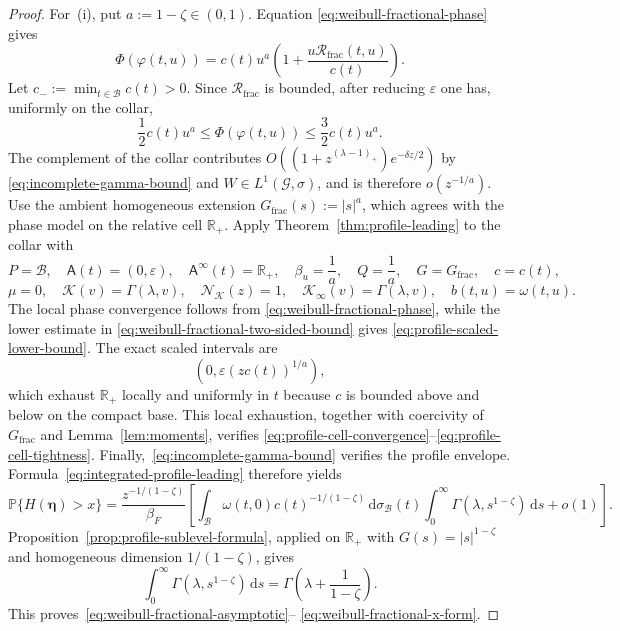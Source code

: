 \documentclass[11pt]{amsart}
\numberwithin{equation}{section}
\theoremstyle{definition}
\theoremstyle{remark}
\newcommand{\R}{\mathbb{R}}
\newcommand{\dd}{\,\mathrm{d}}
\newcommand{\eps}{\varepsilon}
\newcommand{\Afib}{\mathsf{A}}
\begin{document}
\begin{proof}
For~(i), put $a:=1-\zeta\in(0,1)$.  Equation
\eqref{eq:weibull-fractional-phase} gives
\[
 \Phi(\varphi(t,u))
 =c(t)u^a\left(1+\frac{u\mathcal R_{\mathrm{frac}}(t,u)}{c(t)}\right).
\]
Let $c_-:=\min_{t\in\mathcal B}c(t)>0$.  Since
$\mathcal R_{\mathrm{frac}}$ is bounded, after reducing $\eps$ one has,
uniformly on the collar,
\begin{equation}\label{eq:weibull-fractional-two-sided-bound}
 \frac12c(t)u^a
 \le \Phi(\varphi(t,u))
 \le \frac32c(t)u^a.
\end{equation}
The complement of the collar contributes
$O((1+z^{(\lambda-1)_+})e^{-\delta z/2})$ by
\eqref{eq:incomplete-gamma-bound} and $W\in L^1(\mathcal G,\sigma)$, and is
therefore $o(z^{-1/a})$.  Use the ambient homogeneous extension
$G_{\mathrm{frac}}(s):=|s|^a$, which agrees with the phase model on the
relative cell $\R_+$.  Apply Theorem~\ref{thm:profile-leading} to the collar
with
\[
 P=\mathcal B,
 \quad \Afib(t)=(0,\eps),
 \quad \Afib^\infty(t)=\R_+,
 \quad \beta_u=\frac{1}{a},
 \quad Q=\frac{1}{a},
 \quad G=G_{\mathrm{frac}},
 \quad c=c(t),
\]
\[
 \mu=0,
 \quad \mathcal K(v)=\Gamma(\lambda,v),
 \quad \mathcal N_{\mathcal K}(z)=1,
 \quad \mathcal K_\infty(v)=\Gamma(\lambda,v),
 \quad b(t,u)=\omega(t,u).
\]
The local phase convergence follows from
\eqref{eq:weibull-fractional-phase}, while the lower estimate in
\eqref{eq:weibull-fractional-two-sided-bound} gives
\eqref{eq:profile-scaled-lower-bound}.  The exact scaled intervals are
\[
 (0,\eps(zc(t))^{1/a}),
\]
which exhaust $\R_+$ locally and uniformly in $t$ because $c$ is bounded
above and below on the compact base.  This local exhaustion, together with
coercivity of $G_{\mathrm{frac}}$ and Lemma~\ref{lem:moments}, verifies
\eqref{eq:profile-cell-convergence}--\eqref{eq:profile-cell-tightness}.
Finally,~\eqref{eq:incomplete-gamma-bound} verifies the profile envelope.
Formula~\eqref{eq:integrated-profile-leading} therefore yields
\begin{equation}\label{eq:weibull-fractional-profile-application}
 \mathbb P\{H(\bm\eta)>x\}
 =\frac{z^{-1/(1-\zeta)}}{\beta_F}\left[
 \int_{\mathcal B}\omega(t,0)c(t)^{-1/(1-\zeta)}\dd\sigma_{\mathcal B}(t)
 \int_0^\infty\Gamma(\lambda,s^{1-\zeta})\dd s+o(1)\right].
\end{equation}
Proposition~\ref{prop:profile-sublevel-formula}, applied on $\R_+$ with
$G(s)=|s|^{1-\zeta}$ and homogeneous dimension $1/(1-\zeta)$, gives
\[
 \int_0^\infty\Gamma(\lambda,s^{1-\zeta})\dd s
 =\Gamma\left(\lambda+\frac{1}{1-\zeta}\right).
\]
This proves~\eqref{eq:weibull-fractional-asymptotic}--
\eqref{eq:weibull-fractional-x-form}.


\end{proof}
\end{document}
